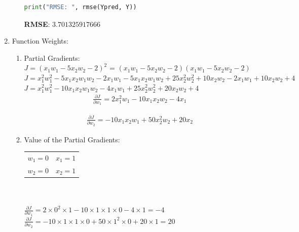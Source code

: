 \documentclass[12pt]{article}
\begin{document}
\begin{enumerate}
\begin{enumerate}
\begin{lstlisting}[language=Python]
			print("RMSE: ", rmse(Ypred, Y))
		\end{lstlisting}
	
	\textbf{RMSE}: $3.701325917666$

		
	
	\end{enumerate}
	

	\item Function Weights:\\
	
	\begin{enumerate}
	
	\item Partial Gradients:\\
	
	$J=(x_1 w_1 -5x_2 w_2-2)^2$ = $(x_1 w_1 -5x_2 w_2-2)$$(x_1 w_1 -5x_2 w_2-2)$\\
	$J=x_1^{2}w_1^{2} - 5x_{1}x_{2}w_{1}w_{2}-2x_{1}w_{1}-5x_{1}x_{2}w_{1}w_{2} + 25x_2^{2}w_2^{2} + 10x_{2}w_2-2x_{1}w_{1} +10x_{2}w_{2} + 4$\\
	$J=x_1^{2}w_1^{2} - 10x_{1}x_{2}w_{1}w_{2} -4x_{1}w_{1} + 25x_2^{2}w_2^{2} + 20x_{2}w_{2} + 4$\\
	
	
	\begin{equation}
		\begin{split}
			\frac{\partial J}{\partial w_1} = 2x_1^{2}w_1 - 10x_{1}x_{2}w_{2} - 4x_{1}
		\end{split}
	\end{equation}

	\begin{equation}
		\begin{split}
			\frac{\partial J}{\partial w_2} = -10x_{1}x_{2}w_{1} + 50x_2^{2}w_2 + 20x_2
		\end{split}
	\end{equation}
	
	\item Value of the Partial Gradients:\\
	
	\begin{tabular}{ c c}
		$w_1 = 0$ & $x_1 = 1$\\ 
		$w_2 = 0$ & $x_2 = 1$ 
	\end{tabular}\\
\\
	
	$\frac{\partial J}{\partial w_1} = 2 \times 0^2 \times 1 - 10 \times 1 \times 1 \times 0 - 4 \times 1 = -4$\\
	$\frac{\partial J}{\partial w_2} = - 10 \times 1 \times 1 \times 0 + 50 \times 1^2 \times 0 + 20 \times 1 = 20$\\
	


\end{enumerate}
\end{enumerate}
\end{document}
